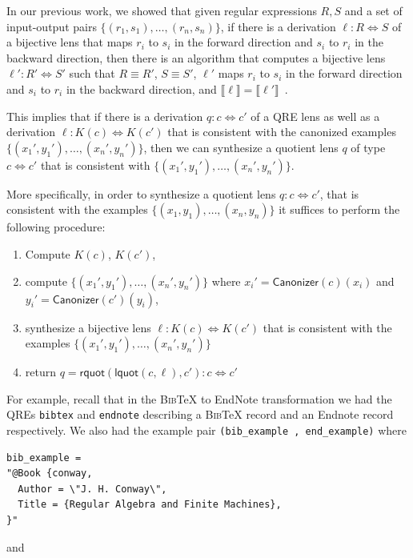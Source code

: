 \documentclass{svproc}
\newcommand{\cd}[1]{\lstinline[backgroundcolor=\color{white}]$#1$}
\newcommand{\kw}[1]{\ensuremath{\mathsf{#1}}}
\newcommand{\canonizer}{\ensuremath{\kw{Canonizer}}}
\newcommand{\bibtex}{\textsc{Bib}\TeX{}}
\begin{document}
In our previous work, we showed that given regular expressions $R, S$ and a set
of input-output pairs $\{(r_1, s_1), \ldots, (r_n, s_n)\}$, if there is a
derivation $\ell : R \Leftrightarrow S$ of a bijective lens that maps $r_i$ to
$s_i$ in the forward direction and $s_i$ to $r_i$ in the backward direction,
then there is an algorithm that computes a bijective lens $\ell' : R'
\Leftrightarrow S'$ such that $R \equiv R'$, $S \equiv S'$, $\ell'$ maps $r_i$
to $s_i$ in the forward direction and $s_i$ to $r_i$ in the backward direction,
and $\llbracket \ell \rrbracket = \llbracket \ell' \rrbracket$~\cite{popl18}.

This implies that if there is a derivation $q : c \Leftrightarrow
c'$ of a QRE lens as well as a derivation $\ell : K(c) \Leftrightarrow K(c')$
that is consistent with the canonized examples $\{({x_1}', {y_1}'),
\ldots, ({x_n}', {y_n}')\}$, then we can synthesize a quotient lens $q$ of
type $c \Leftrightarrow c'$ that is consistent with $\{({x_1}', {y_1}'),
\ldots, ({x_n}', {y_n}')\}$.

More specifically, in order to synthesize a quotient lens $q: c \Leftrightarrow
c'$, that is consistent with the examples $\{(x_1, y_1), \ldots, (x_n, y_n)\}$
 it suffices to perform the following procedure:
\begin{enumerate}
  \item
  Compute $K(c)$, $K(c')$,
  \item
  compute $\{({x_1}', {y_1}'), \ldots, ({x_n}', {y_n}')\}$ where ${x_i}' =
  \canonizer(c)(x_i)$ and ${y_i}' = \canonizer(c')(y_i)$,
  \item
    synthesize a bijective lens $\ell : K(c) \Leftrightarrow K(c')$ that is
    consistent with the examples $\{({x_1}', {y_1}'), \ldots, ({x_n}',
    {y_n}')\}$
  \item 
  return $q = \kw{rquot}(\kw{lquot}(c, \ell), c') : c \Leftrightarrow
  c'$
\end{enumerate}
For example, recall that in the \bibtex{} to EndNote transformation we had the
QREs \cd{bibtex} and \cd{endnote} describing a \bibtex{} record and an Endnote
record respectively. We also had the example pair \cd{(bib_example ,
end_example)} where

\begin{lstlisting}
bib_example = 
"@Book {conway,
  Author = \"J. H. Conway\",
  Title = {Regular Algebra and Finite Machines},
}"
\end{lstlisting}

\noindent and
\end{document}

